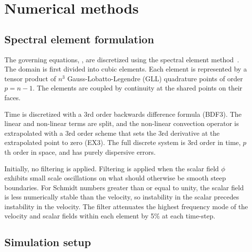 \section{Numerical methods} 

\subsection{Spectral element formulation}
The governing equations, , are discretized using the spectral element method~\cite{Deville2002}.
The domain is first divided into cubic elements.
Each element is represented by a tensor product of $n^3$ Gauss-Lobatto-Legendre (GLL) quadrature points of order $p = n-1$.
The elements are coupled by continuity at the shared points on their faces.

Time is discretized with a 3rd order backwards difference formula (BDF3).
The linear and non-linear terms are split, and the non-linear convection operator is extrapolated with a 3rd order scheme that sets the 3rd derivative at the extrapolated point to zero (EX3).
The full discrete system is 3rd order in time, $p$th order in space, and has purely dispersive errors.

Initially, no filtering is applied.
Filtering is applied when the scalar field $\phi$ exhibits small scale oscillations on what should otherwise be smooth steep boundaries.
For Schmidt numbers greater than or equal to unity, the scalar field is less numerically stable than the velocity, so instability in the scalar precedes instability in the velocity.
The filter attenuates the highest frequency mode of the velocity and scalar fields within each element by 5\% at each time-step.

\subsection{Simulation setup}

